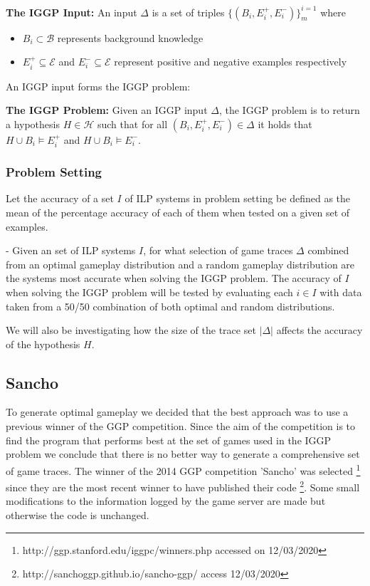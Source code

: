 \documentclass[a4paper,12pt]{report}
\begin{document}
\textbf{The IGGP Input:} An input $\Delta$ is a set of triples $\{(B_i,E_i^+,E_i^-)\}_m^{i=1}$ where
\begin{itemize}
\item $B_i \subset \mathcal{B}$ represents background knowledge
\item $E_i^+ \subseteq \mathscr{E}$ and $E_i^- \subseteq \mathscr{E}$ represent positive and negative examples respectively
\end{itemize}
An IGGP input forms the IGGP problem:

\textbf{The IGGP Problem:} Given an IGGP input $\Delta$, the IGGP problem is to return a hypothesis $H \in \mathscr{H}$ such that for all $(B_i,E_i^+,E_i^-) \in \Delta$ it holds that $H \cup B_i \models E_i^+$ and
$H \cup B_i \models E_i^-$.


\subsubsection{Problem Setting}
Let the accuracy of a set $I$ of ILP systems in problem setting be defined as the mean of the percentage accuracy of each of them when tested on a given set of examples.

- Given an set of ILP systems $I$, for what selection of game traces $\Delta$ combined from an optimal gameplay distribution and a random gameplay distribution are the systems most accurate when solving the IGGP problem. The accuracy of $I$ when solving the IGGP problem will be tested by evaluating each $i \in I$ with data taken from a 50/50 combination of both optimal and random distributions.

We will also be investigating how the size of the trace set $|\Delta|$ affects the accuracy of the hypothesis $H$.

\subsection{Sancho}
To generate optimal gameplay we decided that the best approach was to use a previous winner of the GGP competition. Since the aim of the competition is to find the program that performs best at the set of games used in the IGGP problem we conclude that there is no better way to generate a comprehensive set of game traces. The winner of the 2014 GGP competition 'Sancho' was selected \footnote{http://ggp.stanford.edu/iggpc/winners.php accessed on 12/03/2020} since they are the most recent winner to have published their code \footnote{http://sanchoggp.github.io/sancho-ggp/ access 12/03/2020}. Some small modifications to the information logged by the game server are made but otherwise the code is unchanged.
\end{document}
